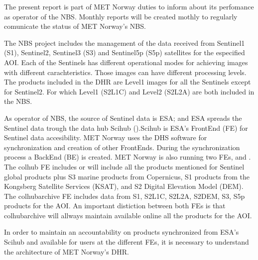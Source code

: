 \documentclass[letterpaper,10pt,english]{jupyterBook}
\begin{document}
\sphinxAtStartPar
The present report is part of MET Norway duties to inform about its perfomance as operator of the NBS. Monthly reports will be created mothly to regularly comunicate the status of MET Norway’s NBS.

\begin{DUlineblock}{0em}
\item[] 
\end{DUlineblock}

\sphinxAtStartPar
The NBS project includes the management of the data received from Sentinel\sphinxhyphen{}1 (S1), Sentinel\sphinxhyphen{}2, Sentinel\sphinxhyphen{}3 (S3) and Sentinel\sphinxhyphen{}5p (S5p) satellites for the especified AOI. Each of the Sentinels has different operational modes for achieving images with different carachteristics. Those images can have different processing levels. The products included in the DHR are Level\sphinxhyphen{}1 images for all the Sentinels except for Sentinel\sphinxhyphen{}2. For which Level\sphinxhyphen{}1 (S2L1C) and Level\sphinxhyphen{}2 (S2L2A) are both included in the NBS.

\begin{DUlineblock}{0em}
\item[] 
\end{DUlineblock}

\sphinxAtStartPar
As operator of NBS, the source of Sentinel data is ESA; and ESA spreads the Sentinel data trough the data hub Scihub ().Scihub is ESA’s FrontEnd (FE) for Sentinel data accesibility. MET Norway uses the DHS software for synchronization and creation of other FrontEnds. During the synchronization process a BackEnd (BE) is created. MET Norway is also running two FEs,  and . The colhub FE includes or will include all the products mentioned for Sentinel global products plus S3 marine products from Copernicus, S1 products from the Kongsberg Satellite Services (KSAT), and S2 Digital Elevation Model (DEM). The colhub\sphinxhyphen{}archive FE includes data from S1, S2L1C, S2L2A, S2DEM, S3, S5p products for the AOI. An important distiction between both FEs is that colhub\sphinxhyphen{}archive will allways maintain available online all the products for the AOI.

\sphinxAtStartPar
In order to maintain an accountability on products synchronized from ESA’s Scihub and available for users at the different FEs, it is necessary to understand the architecture of MET Norway’s DHR.
\end{document}
